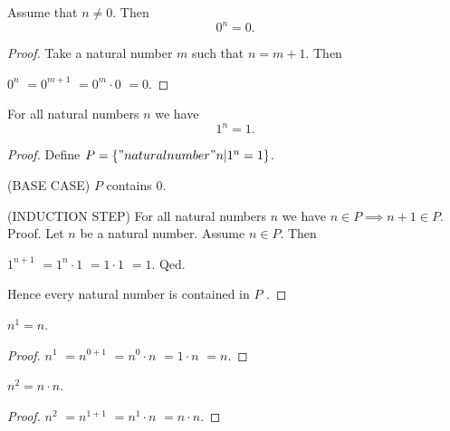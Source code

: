 \documentclass[../../natural-numbers.ftl.tex]{subfiles}
\begin{document}
  \begin{forthel}
    \begin{proposition}[NN 01 04 876526]
      Assume that $n \neq 0$.
      Then
      $$0^{n} = 0.$$
    \end{proposition}
    \begin{proof}
      Take a natural number $m$ such that $n = m + 1$.
      Then

      $  0^{n}$
      $= 0^{m + 1}$       %
      $= 0^{m} \cdot 0$   %
      $= 0$.              %
    \end{proof}


    \begin{proposition}[NN 01 04 577060]
      For all natural numbers $n$ we have
      $$1^{n} = 1.$$
    \end{proposition}
    \begin{proof}
      Define $P = \{ "natural number" n | 1^{n} = 1 \}$.

      (BASE CASE) $P$ contains $0$.

      (INDUCTION STEP) For all natural numbers $n$ we have $n \in P \implies n + 1 \in P$. \\
      Proof.
        Let $n$ be a natural number.
        Assume $n \in P$.
        Then

        $  1^{n + 1}$
        $= 1^{n} \cdot 1$   %
        $= 1 \cdot 1$       %
        $= 1$.              %
      Qed.

      Hence every natural number is contained in $P$ .
    \end{proof}


    \begin{proposition}[NN 01 04 848167]
      $n^{1} = n$.
    \end{proposition}
    \begin{proof}
      $  n^{1}$
      $= n^{0 + 1}$       %
      $= n^{0} \cdot n$   %
      $= 1 \cdot n$       %
      $= n$.              %
    \end{proof}


    \begin{proposition}[NN 01 04 846549]
      $n^{2} = n \cdot n$.
    \end{proposition}
    \begin{proof}
      $  n^{2}$
      $= n^{1 + 1}$       %
      $= n^{1} \cdot n$   %
      $= n \cdot n$.      %
    \end{proof}



\end{forthel}
\end{document}
